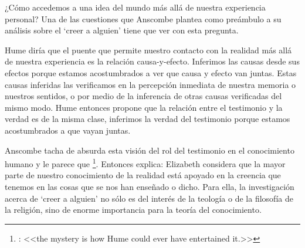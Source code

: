 ¿Cómo accedemos a una idea del mundo más allá de nuestra experiencia personal? Una de las cuestiones que Anscombe plantea como preámbulo a su análisis sobre el `creer a alguien' tiene que ver con esta pregunta.

Hume diría que el puente que permite nuestro contacto con la realidad más allá de nuestra experiencia es la relación causa-y-efecto\autocite[Cf.~][3]{anscombe2008faith:tobelieve}. Inferimos las causas desde sus efectos porque estamos acostumbrados a ver que causa y efecto van juntas. Estas causas inferidas las verificamos en la percepción inmediata de nuestra memoria o nuestros sentidos, o por medio de la inferencia de otras causas verificadas del mismo modo\autocite[Cf.~][88]{anscombe1981parmenides:humeandjulius}. Hume entonces propone que la relación entre el testimonio y la verdad es de la misma clase, inferimos la verdad del testimonio porque estamos acostumbrados a que vayan juntas\autocite[Cf.~][3]{anscombe2008faith:tobelieve}.

Anscombe tacha de absurda esta visión del rol del testimonio en el conocimiento humano\autocite[Cf.~][3]{anscombe2008faith:tobelieve} y le parece que \footnote{\cite[Cf.~][3]{anscombe2008faith:tobelieve}: <<the mystery is how Hume could ever have entertained it.>>}. Entonces explica:  Elizabeth considera que la mayor parte de nuestro conocimiento de la realidad está apoyado en la creencia que tenemos en las cosas que se nos han enseñado o dicho\autocite[Cf.~][3]{anscombe2008faith:tobelieve}. Para ella, la investigación acerca de `creer a alguien' no sólo es del interés de la teología o de la filosofía de la religión, sino de enorme importancia para la teoría del conocimiento\autocite[Cf.~][3]{anscombe2008faith:tobelieve}.

